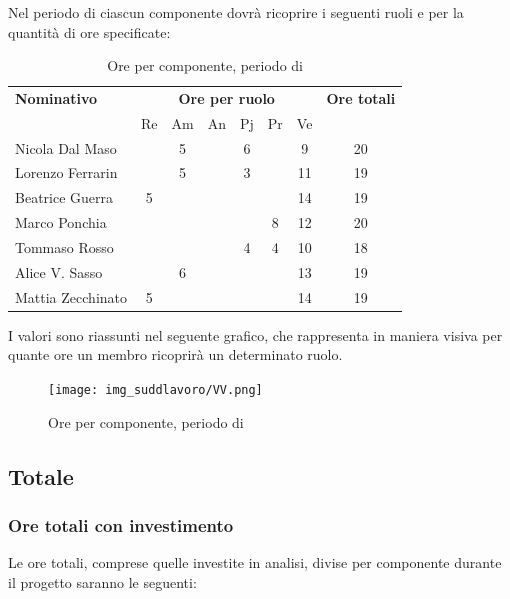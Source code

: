 \subsubsection{\VV}
Nel periodo di \VV{} ciascun componente dovrà ricoprire i seguenti ruoli e per la quantità di ore specificate:

\begin{table}[H]
	\centering
	\begin{tabular}{|l|c|c|c|c|c|c|c|}
		\hline
		\textbf{Nominativo} & 
		\multicolumn{6}{c|}{\textbf{Ore per ruolo}} & 
		\textbf{Ore totali} \\
		& Re & Am & An & Pj & Pr & Ve & \\
		\hline
		Nicola Dal Maso & &5 & &6 & &9 & 20 \\
		Lorenzo Ferrarin & &5 & &3 & &11 & 19 \\
		Beatrice Guerra &5 & & & & &14 & 19 \\
		Marco Ponchia & & & & &8 &12 & 20 \\
		Tommaso Rosso & & & &4 &4 &10 & 18 \\
		Alice V. Sasso & &6 & & & &13 & 19 \\
		Mattia Zecchinato &5 & & & & &14 & 19 \\
		\hline
	\end{tabular}
	\caption{Ore per componente, periodo di \VV{}}
\end{table}
I valori sono riassunti nel seguente grafico, che rappresenta in maniera visiva per quante ore un membro ricoprirà un determinato ruolo.
\begin{figure}[H]
	\centering
	\texttt{[image: img\_suddlavoro/VV.png]}
	\caption{Ore per componente, periodo di \VV{}}
\end{figure}

\subsection{Totale}
\subsubsection{Ore totali con investimento}
Le ore totali, comprese quelle investite in analisi, divise per componente durante il progetto saranno le seguenti:

